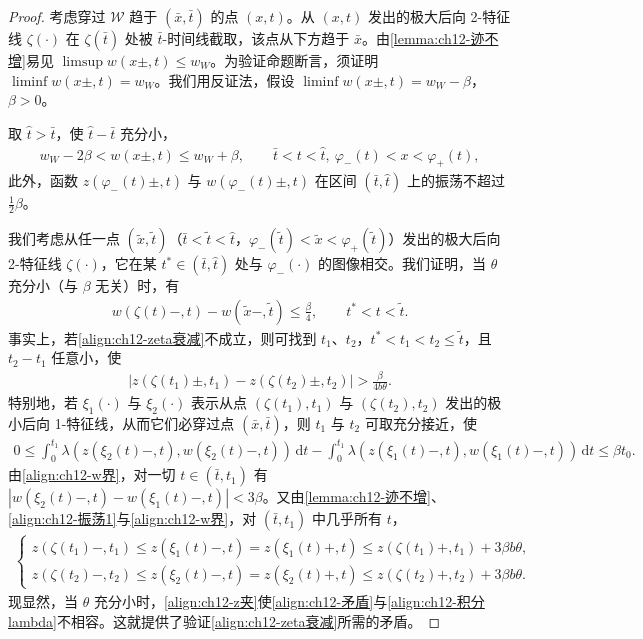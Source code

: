 \documentclass[../../main.tex]{subfiles}
\begin{document}
\begin{proof}
考虑穿过 $\mathscr{W}$ 趋于 $(\bar x,\bar t)$ 的点 $(x,t)$。从 $(x,t)$ 发出的极大后向 2-特征线 $\zeta(\cdot)$ 在 $\zeta(\bar t)$ 处被 $\bar t$-时间线截取，该点从下方趋于 $\bar x$。由\cref{lemma:ch12-迹不增}易见 $\limsup w(x\pm,t)\leqslant w_W$。为验证命题断言，须证明 $\liminf w(x\pm,t)=w_W$。我们用反证法，假设 $\liminf w(x\pm,t)=w_W-\beta$，$\beta>0$。

取 $\hat t>\bar t$，使 $\hat t-\bar t$ 充分小，
\begin{align}
w_W-2\beta<w(x\pm,t)\leqslant w_W+\beta,\qquad \bar t<t<\hat t,\ \varphi_-(t)<x<\varphi_+(t),
\label{align:ch12-w界}
\end{align}
此外，函数 $z(\varphi_-(t)\pm,t)$ 与 $w(\varphi_-(t)\pm,t)$ 在区间 $(\bar t,\hat t)$ 上的振荡不超过 $\frac12\beta$。

我们考虑从任一点 $(\tilde x,\tilde t)$（$\bar t<\tilde t<\hat t$，$\varphi_-(\tilde t)<\tilde x<\varphi_+(\tilde t)$）发出的极大后向 2-特征线 $\zeta(\cdot)$，它在某 $t^*\in(\bar t,\hat t)$ 处与 $\varphi_-(\cdot)$ 的图像相交。我们证明，当 $\theta$ 充分小（与 $\beta$ 无关）时，有
\begin{align}
w(\zeta(t)-,t)-w(\tilde x-,\tilde t)\leqslant\frac{\beta}{4},\qquad t^*<t<\tilde t.
\label{align:ch12-zeta衰减}
\end{align}
事实上，若\eqref{align:ch12-zeta衰减}不成立，则可找到 $t_1$、$t_2$，$t^*<t_1<t_2\leqslant\tilde t$，且 $t_2-t_1$ 任意小，使
\begin{align}
|z(\zeta(t_1)\pm,t_1)-z(\zeta(t_2)\pm,t_2)|>\frac{\beta}{4b\theta}.
\label{align:ch12-矛盾}
\end{align}
特别地，若 $\xi_1(\cdot)$ 与 $\xi_2(\cdot)$ 表示从点 $(\zeta(t_1),t_1)$ 与 $(\zeta(t_2),t_2)$ 发出的极小后向 1-特征线，从而它们必穿过点 $(\bar x,\bar t)$，则 $t_1$ 与 $t_2$ 可取充分接近，使
\begin{align}
0\leqslant\int_0^{t_1}\lambda(z(\xi_2(t)-,t),w(\xi_2(t)-,t))\,\mathrm{d}t-\int_0^{t_1}\lambda(z(\xi_1(t)-,t),w(\xi_1(t)-,t))\,\mathrm{d}t\leqslant\beta t_0.
\label{align:ch12-积分lambda}
\end{align}
由\eqref{align:ch12-w界}，对一切 $t\in(\bar t,t_1)$ 有 $|w(\xi_2(t)-,t)-w(\xi_1(t)-,t)|<3\beta$。又由\cref{lemma:ch12-迹不增}、\eqref{align:ch12-振荡1}与\eqref{align:ch12-w界}，对 $(\bar t,t_1)$ 中几乎所有 $t$，
\begin{align}
\begin{cases}
z(\zeta(t_1)-,t_1)\leqslant z(\xi_1(t)-,t)=z(\xi_1(t)+,t)\leqslant z(\zeta(t_1)+,t_1)+3\beta b\theta,\\
z(\zeta(t_2)-,t_2)\leqslant z(\xi_2(t)-,t)=z(\xi_2(t)+,t)\leqslant z(\zeta(t_2)+,t_2)+3\beta b\theta.
\end{cases}
\label{align:ch12-z夹}
\end{align}
现显然，当 $\theta$ 充分小时，\eqref{align:ch12-z夹}使\eqref{align:ch12-矛盾}与\eqref{align:ch12-积分lambda}不相容。这就提供了验证\eqref{align:ch12-zeta衰减}所需的矛盾。


\end{proof}
\end{document}
